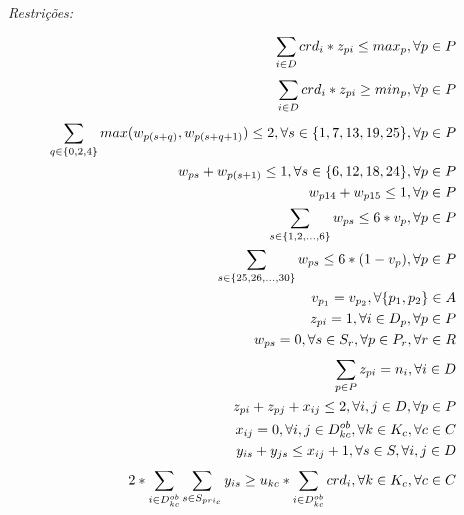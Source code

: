 \emph{Restrições:}
\begin{eqnarray}
\setcounter{equation}{1}
\label{r1}
\sum_{i\in{D}}^{}{crd_i * z_{pi}} \le max_p, \forall{p}\in{P} &&\\
\label{r2}
\sum_{i\in{D}}^{}{crd_i * z_{pi}} \ge min_p, \forall{p}\in{P} &&\\
\label{r3}
\sum_{q\in\{{0,2,4}\}}^{}{max(w_{p(s+q)}, w_{p(s+q+1)})}  \leq 2, \forall{s}\in{\{1,7,13,19,25\}}, \forall{p}\in{P}  &&\\
\label{r4}
w_{ps} + w_{p(s+1)}  \leq 1, \forall{s}\in{\{6, 12, 18, 24\}}, \forall{p}\in{P}  &&\\
\label{r5}
w_{p14} + w_{p15} \leq 1, \forall{p\in{P}} &&\\
\label{r6}
\sum_{s\in\{{1, 2, ..., 6}\}}{w_{ps}} \leq 6*v_p, \forall{p \in{P}} &&\\
\label{r7}
\sum_{s\in\{{25, 26, ..., 30}\}}{w_{ps}} \leq 6*(1-v_p), \forall{p \in{P}} &&\\
\label{r8}
v_{p_1} = v_{p_2}, \forall{\{p_1,p_2\} \in{A}} &&\\
\label{r9}
z_{pi} = 1, \forall{i \in{D_p}}, \forall{p \in{P}} &&\\
\label{r10}
w_{ps} = 0, \forall{s \in{S_r}}, \forall{p \in{P_r}}, \forall{r \in{R}} &&\\
\label{r11}
\sum_{p\in{P}}^{}{z_{pi}} = n_i, \forall{i}\in{D} &&\\
\label{r12}
z_{pi} + z_{pj} + x_{ij} \leq 2, \forall{i,j}\in{D}, \forall{p}\in{P} &&\\
\label{r13}
x_{ij} = 0, \forall{i,j}\in{D_{kc}^{ob}}, \forall{k}\in{K_c}, \forall{c}\in{C} &&\\
\label{r14}
y_{is} + y_{js} \leq x_{ij} + 1, \forall{s}\in{S}, \forall{i, j}\in{D} &&\\
2*\sum_{i \in{D_{kc}^{ob}}}^{}{\sum_{s\in{S_{pri_c}}}^{}{y_{is}}}\geq u_{kc} * \sum_{i \in{D_{kc}^{ob}}}^{}{crd_i}, \forall{k}\in{K_c}, \forall{c}\in{C}  &&
\end{eqnarray}

